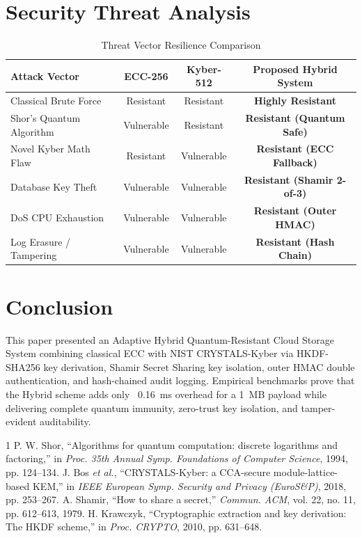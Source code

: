 \documentclass[journal,twoside]{IEEEtran}
\begin{document}
\section{Security Threat Analysis}
\begin{table}[htbp]
\caption{Threat Vector Resilience Comparison}
\label{tab:threats}
\centering
\begin{tabular}{lccc}
\toprule
\textbf{Attack Vector} & \textbf{ECC-256} & \textbf{Kyber-512} & \textbf{Proposed Hybrid System} \\
\midrule
Classical Brute Force & Resistant & Resistant & \textbf{Highly Resistant} \\
Shor's Quantum Algorithm & Vulnerable & Resistant & \textbf{Resistant (Quantum Safe)} \\
Novel Kyber Math Flaw & Resistant & Vulnerable & \textbf{Resistant (ECC Fallback)} \\
Database Key Theft & Vulnerable & Vulnerable & \textbf{Resistant (Shamir 2-of-3)} \\
DoS CPU Exhaustion & Vulnerable & Vulnerable & \textbf{Resistant (Outer HMAC)} \\
Log Erasure / Tampering & Vulnerable & Vulnerable & \textbf{Resistant (Hash Chain)} \\
\bottomrule
\end{tabular}
\end{table}

\section{Conclusion}
This paper presented an Adaptive Hybrid Quantum-Resistant Cloud Storage System combining classical ECC with NIST CRYSTALS-Kyber via HKDF-SHA256 key derivation, Shamir Secret Sharing key isolation, outer HMAC double authentication, and hash-chained audit logging. Empirical benchmarks prove that the Hybrid scheme adds only ~0.16~ms overhead for a 1~MB payload while delivering complete quantum immunity, zero-trust key isolation, and tamper-evident auditability.

\begin{thebibliography}{1}
 P. W. Shor, ``Algorithms for quantum computation: discrete logarithms and factoring,'' in \textit{Proc. 35th Annual Symp. Foundations of Computer Science}, 1994, pp. 124--134.
 J. Bos \textit{et al.}, ``CRYSTALS-Kyber: a CCA-secure module-lattice-based KEM,'' in \textit{IEEE European Symp. Security and Privacy (EuroS\&P)}, 2018, pp. 253--267.
 A. Shamir, ``How to share a secret,'' \textit{Commun. ACM}, vol. 22, no. 11, pp. 612--613, 1979.
 H. Krawczyk, ``Cryptographic extraction and key derivation: The HKDF scheme,'' in \textit{Proc. CRYPTO}, 2010, pp. 631--648.
\end{thebibliography}
\end{document}

